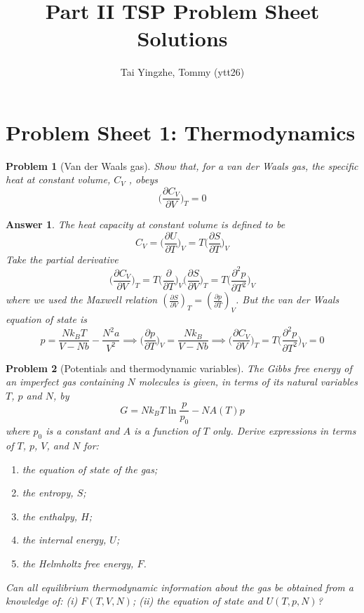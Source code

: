 \documentclass[a4paper]{article}
\title{\textbf{Part II TSP Problem Sheet Solutions}}
\author{Tai Yingzhe, Tommy (ytt26)}
\date{}
\newtheorem{ans}{Answer}[section]
\theoremstyle{new}
\newtheorem{qns}{Problem}[section]
\begin{document}
\maketitle
\tableofcontents
\newpage
\section{Problem Sheet 1: Thermodynamics}
\begin{qns}[Van der Waals gas]
Show that, for a van der Waals gas, the specific heat at constant volume, $C_V$ , obeys 
$$\bigg(\frac{\partial C_V}{\partial V}\bigg)_T=0$$
\end{qns}
\begin{ans}
The heat capacity at constant volume is defined to be
$$C_V=\bigg(\frac{\partial U}{\partial T}\bigg)_V=T\bigg(\frac{\partial S}{\partial T}\bigg)_V$$
Take the partial derivative
$$\bigg(\frac{\partial C_V}{\partial V}\bigg)_T=T\bigg(\frac{\partial}{\partial T}\bigg)_V\bigg(\frac{\partial S}{\partial V}\bigg)_T=T\bigg(\frac{\partial^2p}{\partial T^2}\bigg)_V$$
where we used the Maxwell relation $(\frac{\partial S}{\partial V})_T=(\frac{\partial p}{\partial T})_V$. But the van der Waals equation of state is
$$p=\frac{Nk_BT}{V-Nb}-\frac{N^2a}{V^2}\implies\bigg(\frac{\partial p}{\partial T}\bigg)_V=\frac{Nk_B}{V-Nb}\implies\bigg(\frac{\partial C_V}{\partial V}\bigg)_T=T\bigg(\frac{\partial^2p}{\partial T^2}\bigg)_V=0$$
\end{ans}
\begin{qns}[Potentials and thermodynamic variables]
The Gibbs free energy of an imperfect gas containing $N$ molecules is given, in terms of its natural variables $T$, $p$ and $N$, by
$$G=Nk_BT\ln\frac{p}{p_0}-NA(T)p$$
where $p_0$ is a constant and $A$ is a function of $T$ only. Derive expressions in terms of $T$, $p$, $V$, and $N$ for:
\begin{enumerate}[label=(\alph*)]
\item the equation of state of the gas;
\item the entropy, $S$;
\item the enthalpy, $H$;
\item the internal energy, $U$;
\item the Helmholtz free energy, $F$.
\end{enumerate}
Can all equilibrium thermodynamic information about the gas be obtained from a knowledge of: (i) $F(T, V, N)$; (ii) the equation of state and $U(T, p, N)$?
\end{qns}
\end{document}
